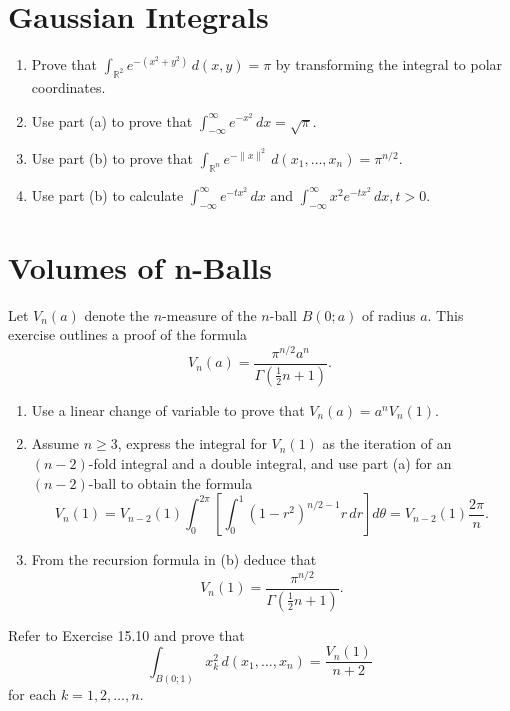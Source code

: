 \section{Gaussian Integrals}

\begin{problembox}
\begin{enumerate}[label=(\alph*)]
\item Prove that \(\int_{\mathbb{R}^2} e^{-(x^2 + y^2)} \, d(x, y) = \pi\) by transforming the integral to polar coordinates.
\item Use part (a) to prove that \(\int_{-\infty}^{\infty} e^{-x^2} \, dx = \sqrt{\pi}\).
\item Use part (b) to prove that \(\int_{\mathbb{R}^n} e^{-\|x\|^2} \, d(x_1, \ldots, x_n) = \pi^{n/2}\).
\item Use part (b) to calculate \(\int_{-\infty}^{\infty} e^{-tx^2} \, dx\) and \(\int_{-\infty}^{\infty} x^2 e^{-tx^2} \, dx, t > 0\).
\end{enumerate}
\end{problembox}

\section{Volumes of n-Balls}

\begin{problembox}
Let \( V_n(a) \) denote the \( n \)-measure of the \( n \)-ball \( B(0; a) \) of radius \( a \). This exercise outlines a proof of the formula
\[
V_n(a) = \frac{\pi^{n/2} a^n}{\Gamma( \frac{1}{2} n + 1 )}.
\]
\begin{enumerate}[label=(\alph*)]
\item Use a linear change of variable to prove that \( V_n(a) = a^n V_n(1) \).
\item Assume \( n \geq 3 \), express the integral for \( V_n(1) \) as the iteration of an \( (n - 2) \)-fold integral and a double integral, and use part (a) for an \( (n - 2) \)-ball to obtain the formula
\[
V_n(1) = V_{n-2}(1) \int_0^{2\pi} \left[ \int_0^1 (1 - r^2)^{n/2 - 1}r \, dr \right] d\theta = V_{n-2}(1) \frac{2\pi}{n}.
\]
\item From the recursion formula in (b) deduce that
\[
V_n(1) = \frac{\pi^{n/2}}{\Gamma(\frac{1}{2}n + 1)}.
\]
\end{enumerate}
\end{problembox}

\begin{problembox}
Refer to Exercise 15.10 and prove that
\[
\int_{B(0;1)} x_k^2 \, d(x_1, \ldots, x_n) = \frac{V_n(1)}{n + 2}
\]
for each \( k = 1, 2, \ldots, n \).
\end{problembox}

